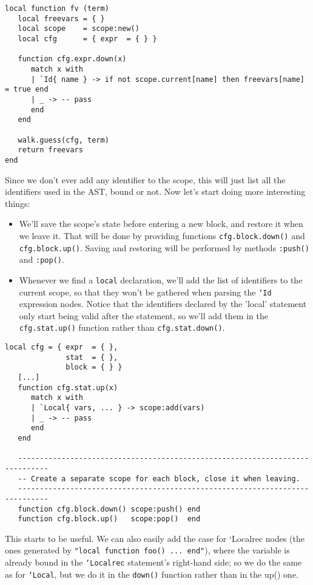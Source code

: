 \begin{verbatim}
local function fv (term)
   local freevars = { }
   local scope    = scope:new()
   local cfg      = { expr  = { } }

   function cfg.expr.down(x)
      match x with
      | `Id{ name } -> if not scope.current[name] then freevars[name] = true end
      | _ -> -- pass
      end
   end

   walk.guess(cfg, term)
   return freevars
end
\end{verbatim}

Since we don't ever add any identifier to the scope, this will just list all the
identifiers used in the AST, bound or not. Now let's start doing more
interesting things:

\begin{itemize}
\item We'll save the scope's state before entering a new block, and restore it
  when we leave it. That will be done by providing functions {\tt cfg.block.down()}
  and {\tt cfg.block.up()}. Saving and restoring will be performed by methods
  {\tt :push()} and {\tt :pop()}.
\item Whenever we find a {\tt local} declaration, we'll add the list of
  identifiers to the current scope, so that they won't be gathered when parsing
  the {\tt `Id} expression nodes. Notice that the identifiers declared by the
  'local' statement only start being valid after the statement, so we'll add
  them in the {\tt cfg.stat.up()} function rather than {\tt cfg.stat.down()}.
\end{itemize}

\begin{verbatim}
local cfg = { expr  = { },
              stat  = { },
              block = { } }
   [...]
   function cfg.stat.up(x)
      match x with
      | `Local{ vars, ... } -> scope:add(vars)
      | _ -> -- pass
      end
   end

   -----------------------------------------------------------------------------
   -- Create a separate scope for each block, close it when leaving.
   -----------------------------------------------------------------------------
   function cfg.block.down() scope:push() end
   function cfg.block.up()   scope:pop()  end  
\end{verbatim}

This starts to be useful. We can also easily add the case for `Localrec{ } nodes
(the ones generated by {\tt "local function foo() ... end"}), where the variable
is already bound in the {\tt`Localrec} statement's right-hand side; so we do the
same as for {\tt`Local}, but we do it in the {\tt down()} function rather than
in the up() one.

